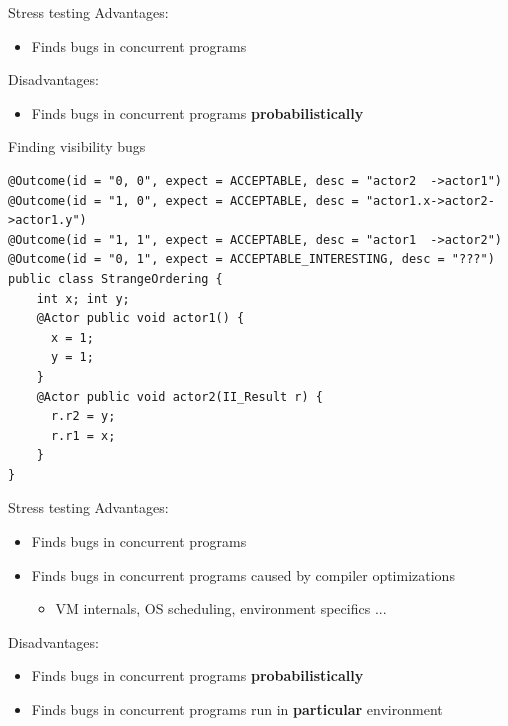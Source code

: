 \begin{frame}[t,fragile]{Stress testing}
Advantages:
\begin{itemize}
  \item Finds bugs in concurrent programs
\end{itemize}

\pause
Disadvantages:
\begin{itemize}
  \item Finds bugs in concurrent programs \textbf{probabilistically}
\end{itemize}
\end{frame}


\begin{frame}[t,fragile]{Finding visibility bugs}
\begin{verbatim}
@Outcome(id = "0, 0", expect = ACCEPTABLE, desc = "actor2  ->actor1")
@Outcome(id = "1, 0", expect = ACCEPTABLE, desc = "actor1.x->actor2->actor1.y")
@Outcome(id = "1, 1", expect = ACCEPTABLE, desc = "actor1  ->actor2")
@Outcome(id = "0, 1", expect = ACCEPTABLE_INTERESTING, desc = "???")
public class StrangeOrdering {
    int x; int y;
    @Actor public void actor1() { 
      x = 1;
      y = 1;
    }
    @Actor public void actor2(II_Result r) { 
      r.r2 = y;
      r.r1 = x;
    }
}
\end{verbatim}
\end{frame}


\begin{frame}[t,fragile]{Stress testing}
Advantages:
\begin{itemize}
  \item Finds bugs in concurrent programs
  \item Finds bugs in concurrent programs caused by compiler optimizations
  \pause
  \begin{itemize}
    \item VM internals, OS scheduling, environment specifics ...
  \end{itemize}
\end{itemize}

\pause
Disadvantages:
\begin{itemize}
  \item Finds bugs in concurrent programs \textbf{probabilistically}
  \pause 
  \item Finds bugs in concurrent programs run in \textbf{particular} environment
\end{itemize}
\end{frame}


